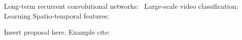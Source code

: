 Long-term recurrent convolutional networks:~\cite{ltrcn}
Large-scale video classification:~\cite{cnnvid}
Learning Spatio-temporal features:~\cite{stf}

Insert proposal here. Example cite:~\cite{dlbook}
